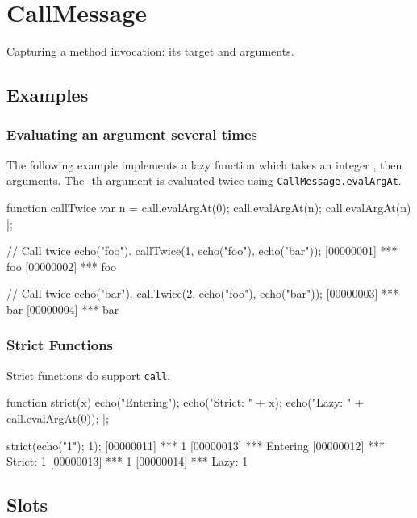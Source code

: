 \section{CallMessage}
Capturing a method invocation: its target and arguments.

\subsection{Examples}
\subsubsection{Evaluating an argument several times}
\label{sec:std-callmsg-examples-several}

The following example implements a lazy function which takes an
integer , then arguments.  The -th argument is evaluated
twice using \lstinline|CallMessage.evalArgAt|.

\begin{urbiscript}
function callTwice
{
  var n = call.evalArgAt(0);
  call.evalArgAt(n);
  call.evalArgAt(n)
} |;

// Call twice echo("foo").
callTwice(1, echo("foo"), echo("bar"));
[00000001] *** foo
[00000002] *** foo

// Call twice echo("bar").
callTwice(2, echo("foo"), echo("bar"));
[00000003] *** bar
[00000004] *** bar
\end{urbiscript}


\subsubsection{Strict Functions}

Strict functions do support \lstinline|call|.

\begin{urbiscript}[firstnumber=last]
function strict(x)
{
  echo("Entering");
  echo("Strict: " + x);
  echo("Lazy:   " + call.evalArgAt(0));
} |;

strict({echo("1"); 1});
[00000011] *** 1
[00000013] *** Entering
[00000012] *** Strict: 1
[00000013] *** 1
[00000014] *** Lazy:   1
\end{urbiscript}


\subsection{Slots}

